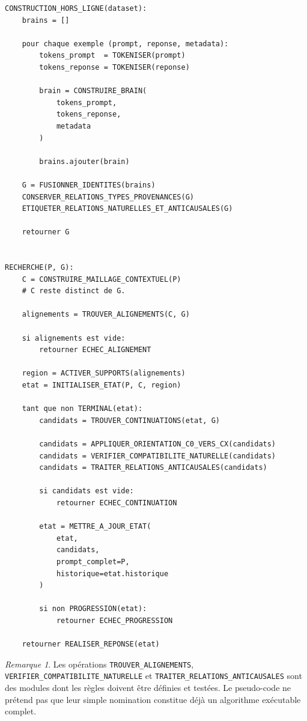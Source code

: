 \documentclass[11pt,a4paper]{report}
\theoremstyle{definition}
\theoremstyle{plain}
\theoremstyle{remark}
\newtheorem{remarque}[definition]{Remarque}
\begin{document}
\begin{verbatim}
CONSTRUCTION_HORS_LIGNE(dataset):
    brains = []

    pour chaque exemple (prompt, reponse, metadata):
        tokens_prompt  = TOKENISER(prompt)
        tokens_reponse = TOKENISER(reponse)

        brain = CONSTRUIRE_BRAIN(
            tokens_prompt,
            tokens_reponse,
            metadata
        )

        brains.ajouter(brain)

    G = FUSIONNER_IDENTITES(brains)
    CONSERVER_RELATIONS_TYPES_PROVENANCES(G)
    ETIQUETER_RELATIONS_NATURELLES_ET_ANTICAUSALES(G)

    retourner G


RECHERCHE(P, G):
    C = CONSTRUIRE_MAILLAGE_CONTEXTUEL(P)
    # C reste distinct de G.

    alignements = TROUVER_ALIGNEMENTS(C, G)

    si alignements est vide:
        retourner ECHEC_ALIGNEMENT

    region = ACTIVER_SUPPORTS(alignements)
    etat = INITIALISER_ETAT(P, C, region)

    tant que non TERMINAL(etat):
        candidats = TROUVER_CONTINUATIONS(etat, G)

        candidats = APPLIQUER_ORIENTATION_C0_VERS_CX(candidats)
        candidats = VERIFIER_COMPATIBILITE_NATURELLE(candidats)
        candidats = TRAITER_RELATIONS_ANTICAUSALES(candidats)

        si candidats est vide:
            retourner ECHEC_CONTINUATION

        etat = METTRE_A_JOUR_ETAT(
            etat,
            candidats,
            prompt_complet=P,
            historique=etat.historique
        )

        si non PROGRESSION(etat):
            retourner ECHEC_PROGRESSION

    retourner REALISER_REPONSE(etat)
\end{verbatim}

\begin{remarque}
Les opérations \texttt{TROUVER\_ALIGNEMENTS},
\texttt{VERIFIER\_COMPATIBILITE\_NATURELLE} et
\texttt{TRAITER\_RELATIONS\_ANTICAUSALES} sont des modules
dont les règles doivent être définies et testées. Le pseudo-code
ne prétend pas que leur simple nomination constitue déjà un
algorithme exécutable complet.
\end{remarque}
\end{document}
